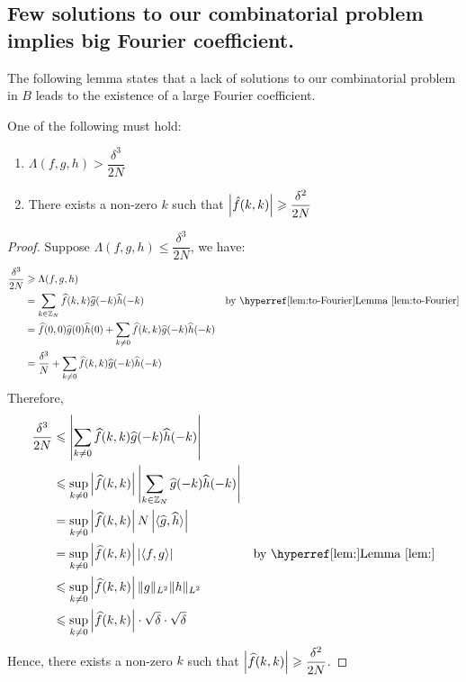 \subsection{Few solutions to our combinatorial problem implies big Fourier coefficient.} The following lemma states that a lack of solutions to our combinatorial problem in $ B $ leads to the existence of a large Fourier coefficient.  
\begin{lemma} \label{lem:big-Fourier}
	One of the following must hold:
	\begin{enumerate}
		\item $ \Lambda(f,g,h) > \dfrac{\delta^3}{2N}$
		\item There exists a non-zero $ k $ such that $ \left\vert{\hat{f}(k,k)}\right\vert \geqslant \dfrac{\delta^2}{2N} $
	\end{enumerate}
\end{lemma}

\begin{proof}
	Suppose  $ \Lambda(f,g,h) \leq \dfrac{\delta^3}{2N}$, we have:
	\begin{align*}
		\dfrac{\delta^3}{2N} & \geq \Lambda(f,g,h) \\
		& = \sum\limits_{k \in \bbZ_N} \widehat{f}(k,k) \widehat{g}(-k) \widehat{h}(-k)  & \text{by \lemmaref{to-Fourier}} \\
		& = \widehat{f}(0,0) \widehat{g}(0) \widehat{h}(0) + \sum\limits_{k \neq 0} \widehat{f}(k,k) \widehat{g}(-k) \widehat{h}(-k) \\
		& = \dfrac{\delta^3}{N} + \sum\limits_{k \neq 0} \widehat{f}(k,k) \widehat{g}(-k) \widehat{h}(-k) \\
	\end{align*}
	Therefore, 
	\begin{align*}
		\dfrac{\delta^3}{2N} 
		& \leq \abs{\sum\limits_{k \neq 0} \widehat{f}(k,k) \widehat{g}(-k) \widehat{h}(-k)} \\
		& \leq \sup_{k \neq 0} \abs{\widehat{f}(k, k)}\abs{\sum\limits_{k \in \bbZ_N}  \widehat{g}(-k) \widehat{h}(-k)} \\
		& = \sup_{k \neq 0} \abs{\widehat{f}(k, k)} N \abs{\langle \widehat{g}, \widehat{h} \rangle} \\
		& = \sup_{k \neq 0} \abs{\widehat{f}(k, k)} \abs{\langle f, g \rangle}  & \text{by \lemmaref{}} \\
		& \leq \sup_{k \neq 0} \abs{\widehat{f}(k, k)} \| g \|_{L^2} \| h \|_{L^2} \\
		& \leq \sup_{k \neq 0} \abs{\widehat{f}(k, k)} \cdot \sqrt{\delta} \cdot \sqrt{\delta}  		
	\end{align*} 
Hence, there exists a non-zero $ k $ such that $ \left\vert{\widehat{f}(k, k)}\right\vert \geqslant \dfrac{\delta^2}{2N} $.
\end{proof}

